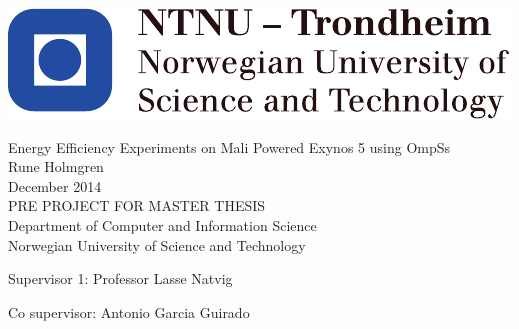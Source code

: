 
\thispagestyle{empty}
\includegraphics[scale=1.1]{fig/NTNU}
\mbox{}\\[6pc]
\begin{center}
\Huge{Energy Efficiency Experiments on Mali Powered Exynos 5 using OmpSs}\\[2pc]

\Large{Rune Holmgren}\\[1pc]
\large{December 2014}\\[2pc]

PRE PROJECT FOR MASTER THESIS\\
Department of Computer and Information Science\\
Norwegian University of Science and Technology
\end{center}
\vfill

\noindent Supervisor 1: Professor Lasse Natvig

\noindent Co supervisor: Antonio Garcia Guirado

